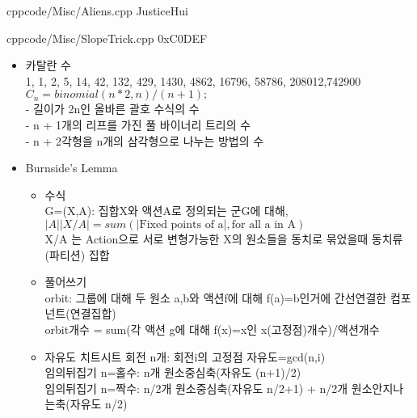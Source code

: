\documentclass[landscape, 8pt, a4paper, oneside, twocolumn]{extarticle}
\begin{document}
{}{}
{cpp}{code/Misc/Aliens.cpp}
{JusticeHui}

{}{}
{cpp}{code/Misc/SlopeTrick.cpp}
{0xC0DEF}

%

%

%

{}{}{}{}{}
\begin{itemize}
\setlength\itemsep{0.1em}
    
\item 카탈란 수\\
1, 1, 2, 5, 14, 42, 132, 429, 1430, 4862, 16796, 58786, 208012,742900\\
$C_n = binomial(n * 2, n) / (n + 1);$\\
- 길이가 2n인 올바른 괄호 수식의 수\\
- n + 1개의 리프를 가진 풀 바이너리 트리의 수\\
- n + 2각형을 n개의 삼각형으로 나누는 방법의 수

\item Burnside’s Lemma
\begin{itemize}
    \item 수식\\
    G=(X,A): 집합X와 액션A로 정의되는 군G에 대해, $\vert A\vert\vert X/A \vert=sum(\vert \text{Fixed points of a}\vert,\text{for all a in A})$\\
    X/A 는 Action으로 서로 변형가능한 X의 원소들을 동치로 묶었을때 동치류(파티션) 집합
    \item 풀어쓰기\\
    orbit: 그룹에 대해 두 원소 a,b와 액션f에 대해 f(a)=b인거에 간선연결한 컴포넌트(연결집합)\\
    orbit개수 = sum(각 액션 g에 대해 f(x)=x인 x(고정점)개수)/액션개수
    \item 자유도 치트시트
    회전 n개: 회전i의 고정점 자유도=gcd(n,i)\\
    임의뒤집기 n=홀수: n개 원소중심축(자유도 (n+1)/2)\\
    임의뒤집기 n=짝수: n/2개 원소중심축(자유도 n/2+1) + n/2개 원소안지나는축(자유도 n/2)
\end{itemize}


\end{itemize}
\end{document}
